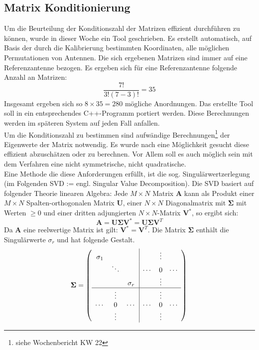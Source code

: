 \documentclass[a4paper,12pt,fleqn]{article}
\begin{document}
\subsection{Matrix Konditionierung}
Um die Beurteilung der Konditionszahl der Matrizen effizient durchführen zu können, wurde in dieser Woche ein Tool geschrieben. Es erstellt automatisch, auf Basis der durch die Kalibrierung bestimmten Koordinaten, alle möglichen Permutationen von Antennen. Die sich ergebenen Matrizen sind immer auf eine Referenzantenne bezogen. Es ergeben sich für eine Referenzantenne folgende Anzahl an Matrizen:
% 
\begin{equation}
\frac{7!}{3!(7-3)!}=35
\end{equation}
%
Insgesamt ergeben sich so $8\times 35 = 280$ mögliche Anordnungen. Das erstellte Tool soll in ein entsprechendes C++-Programm portiert werden. Diese Berechnungen werden im späteren System auf jeden Fall anfallen.\\
Um die Konditionszahl zu bestimmen sind aufwändige Berechnungen\footnote{siehe Wochenbericht KW 22} der Eigenwerte der Matrix notwendig. Es wurde nach eine Möglichkeit gesucht diese effizient abzuschätzen oder zu berechnen. Vor Allem soll es auch möglich sein mit dem Verfahren eine nicht symmetrische, nicht quadratische.\\
Eine Methode die diese Anforderungen erfüllt, ist die sog. Singulärwertzerlegung (im Folgenden SVD := engl. Singular Value Decomposition). Die SVD basiert auf folgender Theorie linearen Algebra: Jede $M \times N$ Matrix $\mathbf{A}$ kann als Produkt einer $M \times N$ Spalten-orthogonalen Matrix $\mathbf{U}$, einer $N \times N$ Diagonalmatrix mit $\mathbf{\Sigma}$ mit Werten $\geq 0$ und einer dritten adjungierten $N \times N$-Matrix $\mathbf{V^*}$, so ergibt sich:
\begin{equation}
\mathbf{A}= \mathbf{U \Sigma V^*} = \mathbf{U \Sigma V}^T
\end{equation}
Da $\mathbf{A}$ eine reelwertige Matrix ist gilt: $ \mathbf{V^*} = \mathbf{V}^T $. Die Matrix $\mathbf{ \Sigma }$ enthält die Singulärwerte $\sigma_r$ und hat folgende Gestalt.
%
\begin{equation}
	\mathbf{\Sigma} = \left(\begin{array}{ccc|ccc}
	\sigma_1 &          &          &        & \vdots &        \\
	         & \ddots   &          & \cdots & 0      & \cdots \\
	         &          & \sigma_r &        & \vdots &        \\
	\hline
	         &  \vdots  &          &        & \vdots &        \\
	\cdots   &  0       & \cdots   & \cdots & 0      & \cdots \\
	         &  \vdots  &          &        & \vdots &        \\
	
	\end{array}\right)\\
\end{equation}
\end{document}
